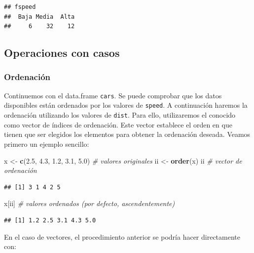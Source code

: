 \documentclass[
]{book}
\newenvironment{Shaded}{\begin{snugshade}}{\end{snugshade}}
\newcommand{\CommentTok}[1]{\textcolor[rgb]{0.56,0.35,0.01}{\textit{#1}}}
\newcommand{\FloatTok}[1]{\textcolor[rgb]{0.00,0.00,0.81}{#1}}
\newcommand{\FunctionTok}[1]{\textcolor[rgb]{0.13,0.29,0.53}{\textbf{#1}}}
\newcommand{\NormalTok}[1]{#1}
\newcommand{\OtherTok}[1]{\textcolor[rgb]{0.56,0.35,0.01}{#1}}
\begin{document}
\begin{verbatim}
## fspeed
##  Baja Media  Alta 
##     6    32    12
\end{verbatim}

\subsection{Operaciones con casos}\label{operaciones-con-casos}

\subsubsection{Ordenación}\label{ordenaciuxf3n}

Continuemos con el data.frame \texttt{cars}.
Se puede comprobar que los datos disponibles están ordenados por
los valores de \texttt{speed}. A continuación haremos la ordenación utilizando
los valores de \texttt{dist}. Para ello, utilizaremos el conocido como vector de
índices de ordenación.
Este vector establece el orden en que tienen que ser elegidos los
elementos para obtener la ordenación deseada.
Veamos primero un ejemplo sencillo:

\begin{Shaded}
\begin{Highlighting}[]
\NormalTok{x }\OtherTok{\textless{}{-}} \FunctionTok{c}\NormalTok{(}\FloatTok{2.5}\NormalTok{, }\FloatTok{4.3}\NormalTok{, }\FloatTok{1.2}\NormalTok{, }\FloatTok{3.1}\NormalTok{, }\FloatTok{5.0}\NormalTok{) }\CommentTok{\# valores originales}
\NormalTok{ii }\OtherTok{\textless{}{-}} \FunctionTok{order}\NormalTok{(x)}
\NormalTok{ii    }\CommentTok{\# vector de ordenación}
\end{Highlighting}
\end{Shaded}

\begin{verbatim}
## [1] 3 1 4 2 5
\end{verbatim}

\begin{Shaded}
\begin{Highlighting}[]
\NormalTok{x[ii] }\CommentTok{\# valores ordenados (por defecto, ascendentemente)}
\end{Highlighting}
\end{Shaded}

\begin{verbatim}
## [1] 1.2 2.5 3.1 4.3 5.0
\end{verbatim}

En el caso de vectores, el procedimiento anterior se podría
hacer directamente con:
\end{document}
